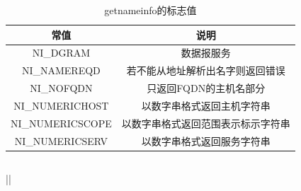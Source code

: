 \begin{table}[!htb]
\centering
	\begin{tabular}{|c|c|}
	\hline
	常值 & 说明 \\
	\hline
	NI\_DGRAM & 数据报服务 \\
	\hline
	NI\_NAMEREQD & 若不能从地址解析出名字则返回错误 \\
	\hline
	NI\_NOFQDN & 只返回FQDN的主机名部分 \\
	\hline
	NI\_NUMERICHOST & 以数字串格式返回主机字符串 \\
	\hline
	NI\_NUMERICSCOPE & 以数字串格式返回范围表示标示字符串 \\
	\hline
	NI\_NUMERICSERV & 以数字串格式返回服务字符串 \\
	\hline
	\end{tabular}
	\caption{getnameinfo的标志值}
\end{table}
\newpage

\subsection{}
||
\noindent \textbf{}
\begin{spacing}{2.0}

\end{spacing}
\newpage
